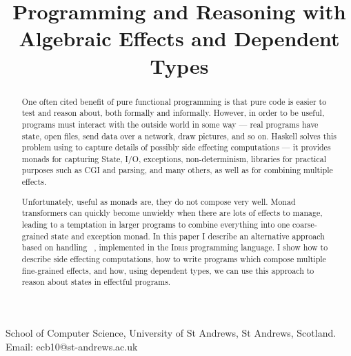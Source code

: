\documentclass[preprint]{sigplanconf}
\newcounter{per}
\newcommand{\Idris}{\textsc{Idris}}
\begin{document}
\title{Programming and Reasoning with Algebraic Effects and Dependent Types}
{School of Computer Science, 
University of St Andrews, St Andrews, Scotland.}
{Email: ecb10@st-andrews.ac.uk}

\maketitle

\begin{abstract}
One often cited benefit of pure functional programming is that pure code is
easier to test and reason about, both formally and informally. However, in
order to be useful, programs must interact with the outside world in some way
--- real programs have state, open files, send data over a network, draw
pictures, and so on. Haskell solves this problem using  to capture
details of possibly side effecting computations --- it provides monads for
capturing State, I/O, exceptions, non-determinism, libraries for practical
purposes such as CGI and parsing, and many others, as well as  for combining multiple effects.

Unfortunately, useful as monads are, they do not compose very well. Monad
transformers can quickly become unwieldy when there are lots of effects to
manage, leading to a temptation in larger programs to combine everything into
one coarse-grained state and exception monad. In this paper I describe an
alternative approach based on handling ~, implemented
in the \Idris{} programming language. I show how to describe side effecting
computations, how to write programs which compose multiple fine-grained
effects, and how, using dependent types, we can use this approach to reason
about states in effectful programs.
\end{abstract}




%

%

%












\begin{small}


\appendix
%

\end{small}
\end{document}

